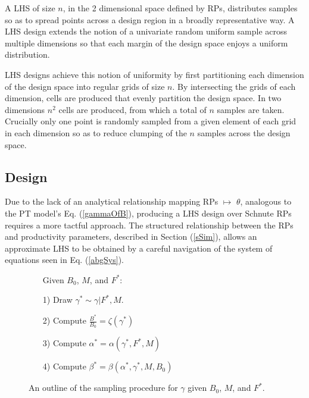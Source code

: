 %
A LHS of size $n$, in the 2 dimensional space defined
by RPs, distributes samples so as to spread points across a design region in a
broadly representative way. A LHS design extends the notion of a univariate
random uniform sample across multiple dimensions so that each margin of the design 
space enjoys a uniform distribution.

%
LHS designs achieve this notion of uniformity by first partitioning each dimension 
of the design space into regular grids of size $n$. By intersecting the grids
of each dimension, cells are produced that evenly partition the design space.
In two dimensions $n^2$ cells are produced, from which a total of $n$ samples
are taken. Crucially only one point is randomly sampled from a given element of
each grid in each dimension so as to reduce clumping of the $n$ samples across
the design space.

%
\subsection{Design \label{sLHS}}

Due to the lack of an analytical relationship mapping RPs $\mapsto$ $\theta$,
analogous to the PT model's Eq. (\ref{gammaOfB}), producing a LHS design
over Schnute RPs requires a more tactful approach.
The structured relationship between the RPs and productivity parameters,
described in Section (\ref{sSim}), allows an approximate LHS to be obtained by
a careful navigation of the system of equations seen in Eq. (\ref{abgSys}).

%
\begin{figure}
\vspace{-0.5cm}
\begin{itemize}
        \item[] \hspace*{-1cm}Given $B_0$, $M$, and $F^*$:
        \item[1)] Draw $\gamma^* \sim \gamma|F^*, M$.
        \item[2)] Compute $\frac{B^*}{B_0} = \zeta(\gamma^*)$
        \item[3)] Compute $\alpha^* = \alpha(\gamma^*, F^*, M)$
        \item[4)] Compute $\beta^* = \beta(\alpha^*, \gamma^*, M, B_0)$
\end{itemize}
\vspace{-0.5cm}
\caption{ An outline of the sampling procedure for $\gamma$
given $B_0$, $M$, and $F^*$.
}
\end{figure}

